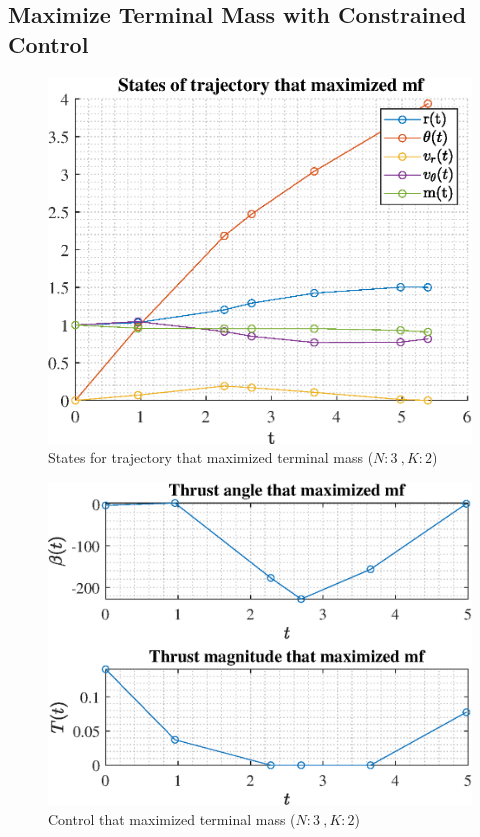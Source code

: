 \documentclass[]{article}
\begin{document}
	\subsection{Maximize Terminal Mass with Constrained Control}
	\begin{figure}
		\centering
		\includegraphics[scale=0.75]{states_N3_K2_C3_mf.eps}
		\caption{States for trajectory that maximized terminal mass (\(N:3\ , K:2\))}
		\label{fig:states_N3_K2_C3_mf}
	\end{figure}
	\begin{figure}
		\centering
		\includegraphics[scale=0.75]{control_N3_K2_C3_mf.eps}
		\caption{Control that maximized terminal mass (\(N:3\ , K:2\))}
		\label{fig:control_N3_K2_C3_mf}
	\end{figure}
\end{document}
